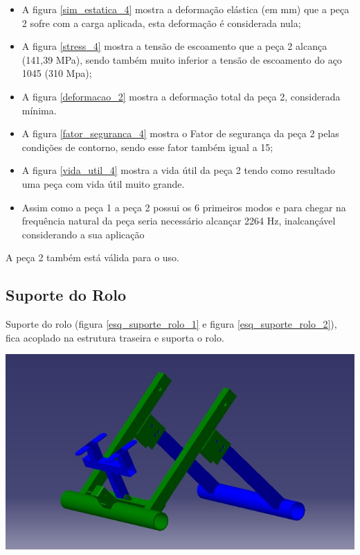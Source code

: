     \begin{itemize}
        \item A figura \ref{sim_estatica_4} mostra a deformação elástica (em mm) que a peça 2 sofre com a carga aplicada, esta deformação é considerada nula;
        \item A figura \ref{stress_4} mostra a tensão de escoamento que a peça 2 alcança (141,39 MPa), sendo também muito inferior a tensão de escoamento do aço 1045 (310 Mpa);
        \item A figura \ref{deformacao_2} mostra a deformação total da peça 2, considerada mínima.
        \item A figura \ref{fator_seguranca_4} mostra o Fator de segurança da peça 2 pelas condições de contorno, sendo esse fator também igual a 15;
        \item A figura \ref{vida_util_4} mostra a vida útil da peça 2 tendo como resultado uma peça com vida útil muito grande.
        \item Assim como a peça 1 a peça 2 possui os 6 primeiros modos e para chegar na frequência natural da peça seria necessário alcançar 2264 Hz, inalcançável considerando a sua aplicação
    \end{itemize}

A peça 2 também está válida para o uso.

\subsection{Suporte do Rolo}

Suporte do rolo (figura \ref{esq_suporte_rolo_1} e figura \ref{esq_suporte_rolo_2}), fica acoplado na estrutura traseira e suporta o rolo.
 
    \begin{center}
    	\includegraphics[scale=0.7]{figuras/esq_suporte_rolo_1}
        \label{esq_suporte_rolo_1}
    \end{center} 

